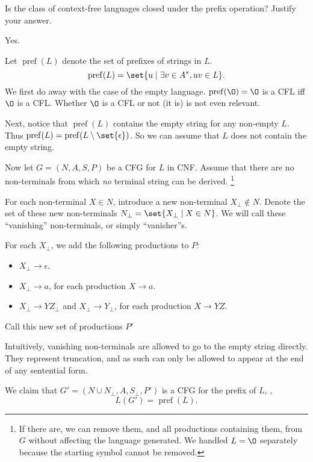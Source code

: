 \documentclass[12pt]{article}
\DeclareMathOperator{\pref}{pref}
\begin{document}
\begin{problem*}
    Is the class of context-free languages closed under the
    prefix operation?
    Justify your answer.
\end{problem*}
\begin{solution}
    Yes.

    Let $\pref(L)$ denote the set of prefixes of strings in $L$. \[
        \pref(L) = \set{u \mid \exists v \in A^*, uv \in L}.
    \]
    We first do away with the case of the empty language.
    $\pref(\O) = \O$ is a CFL iff $\O$ is a CFL.
    Whether $\O$ is a CFL or not (it is) is not even relevant.

    Next, notice that $\pref(L)$ contains the empty string for any non-empty
    $L$.
    Thus $\pref(L) = \pref(L \setminus \set{\epsilon})$.
    So we can assume that $L$ does not contain the empty string.

    Now let $G = (N, A, S, P)$ be a CFG for $L$ in CNF.
    Assume that there are no non-terminals from which \emph{no}
    terminal string can be derived.%
    \footnote{If there are, we can remove them, and all productions
    containing them, from $G$ without affecting the language generated.
    We handled $L = \O$ separately because the starting symbol cannot
    be removed.}

    For each non-terminal $X \in N$, introduce a new non-terminal
    $X_\bot \notin N$.
    Denote the set of these new non-terminals
    $N_\bot = \set{X_\bot \mid X \in N}$.
    We will call these ``vanishing'' non-terminals, or simply
    ``vanisher''s.

    For each $X_\bot$, we add the following productions to $P$:
    \begin{itemize}
        \item $X_\bot \to \epsilon$.
        \item $X_\bot \to a$, for each production $X \to a$.
        \item $X_\bot \to Y Z_\bot$ and $X_\bot \to Y_\bot$,
        for each production $X \to Y Z$.
    \end{itemize}
    Call this new set of productions $P'$

    Intuitively, vanishing non-terminals are allowed to go to the empty
    string directly.
    They represent truncation, and as such can only be allowed to appear
    at the end of any sentential form.

    We claim that $G' = (N \cup N_\bot, A, S_\bot, P')$
    is a CFG for the prefix of $L$,
    \ie, \[
        L(G') = \pref(L).
    \]


\end{solution}
\end{document}

